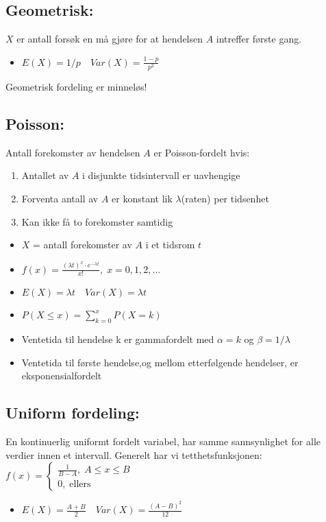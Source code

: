 \documentclass[8pt,a4paper,twocolumn,twoside]{article}
\begin{document}
\subsection*{Geometrisk:}
$X$ er antall forsøk en må gjøre for at hendelsen $A$ intreffer første gang.
\begin{itemize}[topsep=0pt,itemsep=0pt, partopsep=0pt]
    \item $E(X)=1/p \quad Var(X)=\frac{1-p}{p^2}$
\end{itemize}
Geometrisk fordeling er minneløs!
%
%
\subsection*{Poisson:}
Antall forekomster av hendelsen $A$ er Poisson-fordelt hvis:
\begin{enumerate}[topsep=0pt,itemsep=0pt, partopsep=0pt]
    \item Antallet av $A$ i disjunkte tidsintervall er uavhengige
    \item Forventa antall av $A$ er konstant lik $\lambda$(raten) per tidsenhet
    \item Kan ikke få to forekomster samtidig
\end{enumerate}
\begin{itemize}[topsep=0pt,itemsep=0pt, partopsep=0pt]
    \item $X$ = antall forekomster av $A$ i et tidsrom $t$
    \item $f(x) = \frac{(\lambda t)^x\cdot e^{-\lambda t}}{x!},\; x=0,1,2,\dots$
    \item $E(X) = \lambda t \quad Var(X) = \lambda t$
    \item $P(X\leq x)=\sum_{k=0}^x P(X=k)$
    \item Ventetida til hendelse k er gammafordelt med $\alpha =k$ og $\beta=1/\lambda$
    \item Ventetida til første hendelse,og mellom etterfølgende hendelser, er eksponensialfordelt
\end{itemize}
%
%
\subsection*{Uniform fordeling:}
En kontinuerlig uniformt fordelt variabel, har samme sannsynlighet for alle
verdier innen et intervall. Generelt har vi tetthetsfunksjonen:
$f(x)=\begin{cases}
    \frac{1}{B-A},\; A\leq x\leq B\\
    0,\; \text{ellers}
\end{cases}$
\begin{itemize}[topsep=0pt,itemsep=0pt, partopsep=0pt]
    \item $E(X)=\frac{A+B}{2} \quad Var(X)=\frac{(A-B)^2}{12}$
\end{itemize}
%
%
\end{document}
